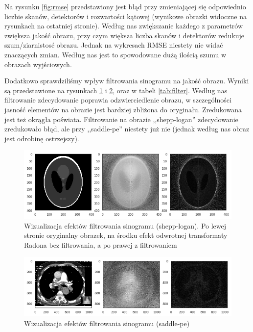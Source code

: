 \documentclass[11pt]{article}
\begin{document}
Na rysunku \ref{fig:rmse} przedstawiony jest błąd przy zmieniającej się odpowiednio liczbie skanów, detektorów i rozwartości kątowej (wynikowe obrazki widoczne na rysunkach na ostatniej stronie). Według nas zwiększanie każdego z parametrów zwiększa jakość obrazu, przy czym większa liczba skanów i detektorów redukuje szum/ziarnistosć obrazu. Jednak na wykresach RMSE niestety nie widać znaczących zmian. Według nas jest to spowodowane dużą ilością szumu w obrazach wyjściowych.

Dodatkowo sprawdziliśmy wpływ filtrowania sinogramu na jakość obrazu. Wyniki są przedstawione na rysunkach \ref{fig:filter-1} i \ref{fig:filter-2}, oraz w tabeli \ref{tab:filter}.
Według nas filtrowanie zdecydowanie poprawia odzwierciedlenie obrazu, w szczególności jasność elementów na obrazie jest bardziej zbliżona do oryginału. Zredukowana jest też okrągła poświata.
Filtrowanie na obrazie ,,shepp-logan'' zdecydowanie zredukowało błąd, ale przy ,,saddle-pe'' niestety już nie (jednak według nas obraz jest odrobinę ostrzejszy).

\begin{figure}[h]
	\includegraphics[width=\linewidth]{res/filter1.png}
	\caption{Wizualizacja efektów filtrowania sinogramu (shepp-logan). Po lewej stronie oryginalny obrazek, na środku efekt odwrotnej transformaty Radona bez filtrowania, a po prawej z filtrowaniem}
	\label{fig:filter-1}
\end{figure}

\begin{figure}[h]
	\includegraphics[width=\linewidth]{res/filter2.png}
	\caption{Wizualizacja efektów filtrowania sinogramu (saddle-pe)}
	\label{fig:filter-2}
\end{figure}
\end{document}

